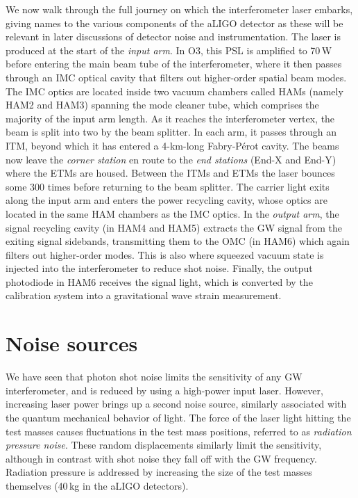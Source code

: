 We now walk through the full journey on which the interferometer laser embarks, giving names to the various components of the aLIGO detector as these will be relevant in later discussions of detector noise and instrumentation.
The laser is produced at the start of the \textit{input arm}.
In O3, this \ac{PSL} is amplified to 70\,W before entering the main beam tube of the interferometer, where it then passes through an \ac{IMC} optical cavity that filters out higher-order spatial beam modes.
The \ac{IMC} optics are located inside two vacuum chambers called \acp{HAM} (namely HAM2 and HAM3) spanning the mode cleaner tube, which comprises the majority of the input arm length.
As it reaches the interferometer vertex, the beam is split into two by the beam splitter.
In each arm, it passes through an \ac{ITM}, beyond which it has entered a 4-km-long Fabry-P\'erot cavity.
The beams now leave the \textit{corner station} en route to the \textit{end stations} (End-X and End-Y) where the \acp{ETM} are housed.
Between the \acp{ITM} and \acp{ETM} the laser bounces some 300 times before returning to the beam splitter.
The carrier light exits along the input arm and enters the power recycling cavity, whose optics are located in the same \ac{HAM} chambers as the \ac{IMC} optics.
In the \textit{output arm}, the signal recycling cavity (in HAM4 and HAM5) extracts the GW signal from the exiting signal sidebands, transmitting them to the \ac{OMC} (in HAM6) which again filters out higher-order modes.
This is also where squeezed vacuum state is injected into the interferometer to reduce shot noise.
Finally, the output photodiode in HAM6 receives the signal light, which is converted by the calibration system into a gravitational wave strain measurement.


\section{Noise sources}

We have seen that photon shot noise limits the sensitivity of any GW interferometer, and is reduced by using a high-power input laser.
However, increasing laser power brings up a second noise source, similarly associated with the quantum mechanical behavior of light.
The force of the laser light hitting the test masses causes fluctuations in the test mass positions, referred to as \textit{radiation pressure noise}.
These random displacements similarly limit the sensitivity, although in contrast with shot noise they fall off with the GW frequency.
Radiation pressure is addressed by increasing the size of the test masses themselves (40\,kg in the aLIGO detectors).


